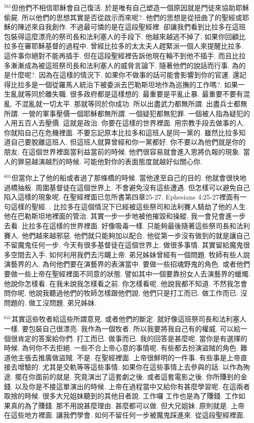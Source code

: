 \documentclass{book}
\begin{document}
$^{561}$但他們不相信耶穌會自己復活.
於是唯有自己塑造一個原因就是門徒來協助耶穌偷屍.
所以他們的思想其實是否從啟示而來呢?.
他們的思想是從扭曲了的聖經或耶穌的陳述來自我創作.
不過最可憐的是在這段聖經裡.
卻讓我們看到比拉多在這班包裝得這麼漂亮的祭司長和法利塞人的手段下.
他越來越逃不掉了.
如果你回顧比拉多在審耶穌基督的過程中.
曾經比拉多的太太夫人趕緊派一個人來提醒比拉多.
這件事你絕對不能再插手.
但在這段聖經裡告訴他現在輪不到他不插手.
而且比拉多漸漸成為被這班祭司長和法利塞人的威脅言論下.
隨著他們的說話而行事.
為的是什麼呢?.
因為在這樣的情況下.
如果你不做事的話可能會影響到你的官運.
還記得比拉多是一個從羅馬人統治下被委派去巴勒斯坦地作為巡撫的工作嗎?.
如果一生亂就等同於離失職.
很多政府都是這樣想的.
最重要是平亂止暴.
最重要不要有混亂.
不混亂就一切太平.
那就等同於你成功.
所以出盡武力都無所謂.
出盡兵士都無所謂.
一營的軍事壓價一個耶穌都無所謂.
一個疑犯都無犯罪.
一個被人指為疑犯的人用五百人去壓價.
這就是政治.
你要在這樣的世界裡面.
用宗教手段去做事的人.
你就陷自己在危機裡面.
不要忘記原本比拉多和這班人是同一黨的.
雖然比拉多知道自己要脫離這班人.
但這班人就算曾經和你一黨都好.
你不要以為他們就是你的朋友.
在這個世界裡面當利益當前的時候.
他們很容易就會進入恩將仇報的現象.
當人的罪惡越演越烈的時候.
可能他對你的表面態度就越好似關心你.

$^{601}$但當你上了他的船或者過了那條橋的時候.
當他達至自己的目的.
他就會很快地過橋抽板.
周圍基督徒在這個世界上.
不會避免沒有這些遭遇.
但怎樣可以避免自己陷入這樣的現象呢.
在聖經裡面已忽所書第四章25-27.
Ephesians 4:25-27裡面有一句這樣的聖經.
.
比拉多在這個情況下已經被這些祭司和法利賽人騎劫了他的人生.
他在巴勒斯坦地裡面的管治.
其實一步一步地被他摧毀和操縱.
我一會兒會進一步去看.
比拉多在這樣的世界裡面.
好像吸毒一樣.
只能夠最後隨著這些祭司長和法利賽人.
他們越來越邪惡.
他們就只能夠加以配合.
他從第一步沒有做到的就是讓自己不留魔鬼任何一步.
今天有很多基督徒在這個世界上.
做很多事情.
其實留給魔鬼很多空間去入手.
如何利用我們去污衊上帝.
弟兄姊妹曾經有一個問題.
牧師有些人說演藝界的人.
為何他們要在演藝界的表演當中.
要做一些招魂野鬼的角色.
或者他們要做一些上帝在聖經裡面不同意的狀態.
譬如其中一個要靠扮女人去演藝界的蠟燭.
他說你怎樣看.
在我未說我怎樣看之前.
你怎樣看呢.
他說我都不知道.
不然我怎會問你呢.
他說我聽過他們的牧師怎樣跟他們說.
他們只是打工而已.
做工作而已.
沒問題的.
做工沒問題.
弟兄姊妹.

$^{641}$其實這些牧者給這些所謂意見.
或者他們的斷定.
就好像這班祭司長和法利塞人一樣.
要包裝自己很漂亮.
我作為一個牧者.
所以我要將我自己有的權威.
可以給一個很肯定的答案給你們.
打工而已.
做事而已.
我的回答是甚麼呢.
當你是有選擇的時候.
為何你不去拒絕.
一些不合上帝心意的事情呢.
有些都去扮演盜賊的角色.
難道他主張去推廣做盜賊.
不是.
在聖經裡面.
上帝很鮮明的一件事.
有些事是上帝直接去增驗的.
尤其是交軌等等這些事情.
如果你在這些事情上去參與的話.
以作為殉途.
擺在你面前的就是.
究竟演出了這套劇之後.
或者這套電影之後.
你所賺到的金錢.
以及你是不接這單演出的時候.
上帝在過程當中又給你有甚麼學習呢.
在這兩者取捨的時候.
很多大兄姐妹聽到的其他目者說.
工作囉 工作也是為了賺錢.
工作如果真的為了賺錢.
那不用說甚麼理由.
甚麼都可以做.
但大兄姐妹.
原則就是.
上帝在這些地方裡面.
讓我們學會.
如何不留任何一步被魔鬼踩進來.
從這段聖經裡面.
\end{document}
